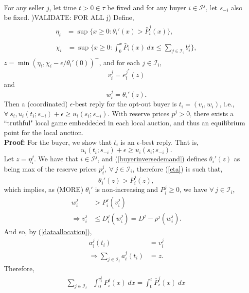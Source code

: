 \documentclass[12pt]{article}
\theoremstyle{definition}
\newcommand{\mcI}{\mathcal{I}}
\begin{document}
\begin{multicols}{2}
{
For any seller $j$, let time $t>0 \in \tau$ be fixed and for any buyer $i\in
\mcI^j$, let $s_{-i}$ also be fixed. )VALIDATE: FOR ALL j) Define,
\begin{align}
\begin{split}\label{eta}
    \eta_i &= \sup\bigg\lbrace x\ge 0 : 
 {\theta_i}'(x) > \bar{P}_i^j(x)\bigg\rbrace, 
\end{split}\\
\begin{split}\label{chi}
    \chi_i &= \sup\bigg\lbrace x\ge 0: 
\displaystyle\int_0^x 
    \bar{P}_i(x) \ dx \le \sum_{j\in\mcI_i}b_i^j \bigg\rbrace,
\end{split}
\end{align}
$z = \min(\eta_i, \chi_i - \epsilon / \theta_i'(0))^+$, and for each $j \in
\mcI_i$, 
$$
    v_i^j = e_i^{j^*}(z) 
$$
and 
$$
    w_i^j = \theta_i'(z).%
$$
Then a (coordinated) $\epsilon$-best reply for the opt-out buyer is $t_i =
(v_i,w_i)$, i.e., $\forall \ s_i, u_i(t_i;s_{-i}) + \epsilon \ge u_i(s_i;
s_{-i})$.
With reserve prices $p^j >0$, there exists a ``truthful" local game embeddeded
in each local auction, and thus an equilibrium point for the local auction. 
}\\
\textbf{Proof:}
For the buyer, we show that $t_i$ is an $\epsilon$-best reply. That is,
$$
    u_i(t_i;s_{-i}) + \epsilon \ge u_i(s_i;s_{-i}).
$$
Let $z = \eta_i^j$. We have that $i\in\mcI^j$, 
and (\ref{buyerinversedemand}) defines $\theta_i'(z)$ as being
max of the reserve prices $p_i^j,\ \forall \ j\in\mcI_i$, therefore
(\ref{eta}) is such that,
$$
    \theta_i'(z) > \bar{P}_i^j(z),
$$ 
which implies, as (MORE) $\theta_i'$ is non-increasing and $P_i^j \ge 0$,
we have $\forall \ j \in \mcI_i$, 
\begin{align*}
    w_i^j &> P_i^j(v_i^j) \\
    \Rightarrow v_i^j &\le D_i^j(w_i^j) = D^j - \rho^j(w_i^j).
\end{align*}
And so, by (\ref{dataallocation}),
\begin{align*}
    a_i^j(t_i) &= v_i^j \\
    \Rightarrow \displaystyle\sum_{j\in\mcI_i} a_i^j(t_i) &= z.
\end{align*}
Therefore,
\begin{align*}
    \displaystyle\sum_{j\in\mcI_i}&\int_0^{v_i^j} P_i^j(x) \ dx =  \int_0^{z}
    \bar{P}_i^j(x) \ dx \\

\end{align*}
\end{multicols}
\end{document}
